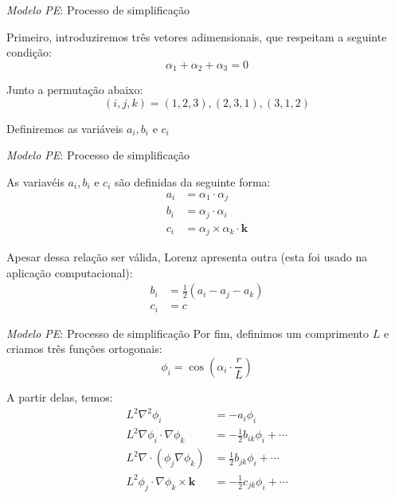 
\begin{frame}{\textit{Modelo PE}: Processo de simplificação}

Primeiro, introduziremos três vetores adimensionais, que respeitam a seguinte condição:
\begin{equation}
    \alpha_1 + \alpha_2 + \alpha_3 = 0
\end{equation}

Junto a permutação abaixo:
\begin{equation}
    (i, j, k) = (1,2,3), (2,3,1), (3,1,2) \label{eq:permutacao}
\end{equation}

Definiremos as variáveis $a_i, b_i$ e $c_i$
\end{frame}


\begin{frame}{\textit{Modelo PE}: Processo de simplificação}

As variavéis $a_i, b_i$ e $c_i$ são definidas da seguinte forma:
\begin{align*}
    a_i &= \alpha_1 \cdot \alpha_j\\
    b_i &= \alpha_j \cdot \alpha_i\\
    c_i &= \alpha_j \times \alpha_k \cdot \mathbf{k}
\end{align*}

Apesar dessa relação ser  válida, Lorenz apresenta outra (esta foi usado na aplicação computacional):
    \begin{align*}
        b_i &= \frac{1}{2}\left(a_i - a_j - a_k\right)\\
        c_i &= c
    \end{align*}
\end{frame}


\begin{frame}{\textit{Modelo PE}: Processo de simplificação}
    Por fim, definimos um comprimento $L$ e criamos três funções ortogonais:
    \begin{equation*}
        \phi_i = \cos\left(\alpha_i \cdot \frac{r}{L}\right)
    \end{equation*}

    A partir delas, temos:
    \small
    \begin{align*}
        L^2\nabla^2\phi_i &= -a_i\phi_i \\
        L^2\nabla\phi_i \cdot \nabla\phi_k &= -\frac{1}{2}b_{ik}\phi_i + \cdots \\
        L^2\nabla \cdot (\phi_j\nabla\phi_k) &= \frac{1}{2}b_{jk}\phi_i + \cdots \\
        L^2\phi_j \cdot \nabla\phi_k \times \mathbf{k} &= -\frac{1}{2}c_{jk}\phi_i + \cdots
    \end{align*}
\end{frame}

